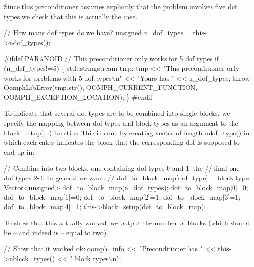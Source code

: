 Since this preconditioner assumes explicitly that the problem involves five dof types we check that this is actually the case.


\begin{DoxyCodeInclude}

  \textcolor{comment}{// How many dof types do we have?}
  \textcolor{keywordtype}{unsigned} n\_dof\_types = this->ndof\_types();


\textcolor{preprocessor}{#ifdef PARANOID}
  \textcolor{comment}{// This preconditioner only works for 5 dof types}
  \textcolor{keywordflow}{if} (n\_dof\_types!=5)
   \{
    std::stringstream tmp;
    tmp << \textcolor{stringliteral}{"This preconditioner only works for problems with 5 dof types\(\backslash\)n"}
        << \textcolor{stringliteral}{"Yours has "} << n\_dof\_types;
    \textcolor{keywordflow}{throw} OomphLibError(tmp.str(),
                        OOMPH\_CURRENT\_FUNCTION,
                        OOMPH\_EXCEPTION\_LOCATION);
   \}
\textcolor{preprocessor}{#endif}

\end{DoxyCodeInclude}


To indicate that several dof types are to be combined into single blocks, we specify the mapping between dof types and block types as an argument to the {\ttfamily block\+\_\+setup}(...) function This is done by creating vector of length {\ttfamily ndof\+\_\+type()} in which each entry indicates the block that the corresponding dof is supposed to end up in\+:


\begin{DoxyCodeInclude}
  \textcolor{comment}{// Combine into two blocks, one containing dof types 0 and 1, the}
  \textcolor{comment}{// final one dof types 2-4. In general we want:}
  \textcolor{comment}{// dof\_to\_block\_map[dof\_type] = block type}
  Vector<unsigned> dof\_to\_block\_map(n\_dof\_types);
  dof\_to\_block\_map[0]=0;
  dof\_to\_block\_map[1]=0;
  dof\_to\_block\_map[2]=1;
  dof\_to\_block\_map[3]=1;
  dof\_to\_block\_map[4]=1;
  this->block\_setup(dof\_to\_block\_map);

\end{DoxyCodeInclude}


To show that this actually worked, we output the number of blocks (which should be -- and indeed is -- equal to two).


\begin{DoxyCodeInclude}
  \textcolor{comment}{// Show that it worked ok:}
  oomph\_info << \textcolor{stringliteral}{"Preconditioner has "} 
             << this->nblock\_types() << \textcolor{stringliteral}{" block types\(\backslash\)n"};

\end{DoxyCodeInclude}


